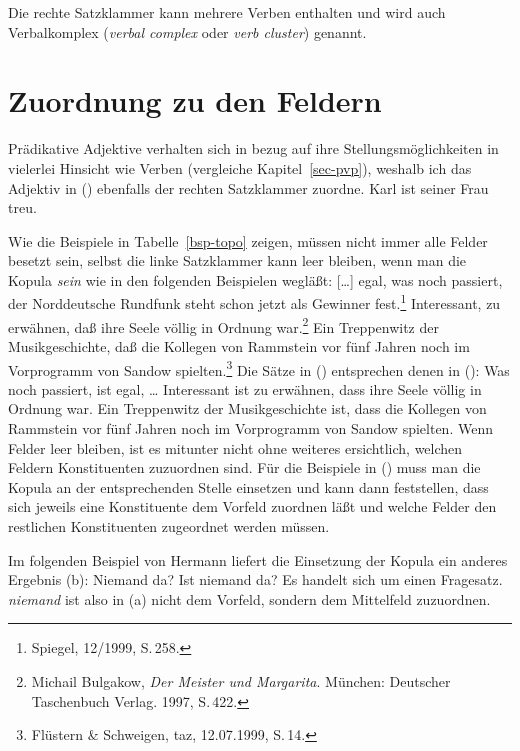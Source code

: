 Die rechte Satzklammer kann mehrere Verben enthalten und wird auch 
Verbalkomplex (\emph{verbal complex} oder \emph{verb cluster}) genannt.

\section{Zuordnung zu den Feldern}

Prädikative Adjektive verhalten sich in bezug auf ihre Stellungsmöglichkeiten in vielerlei Hinsicht
wie Verben (vergleiche Kapitel~\ref{sec-pvp}), weshalb ich das Adjektiv in () ebenfalls der
rechten Satzklammer zuordne.
\ea
Karl ist seiner Frau treu.
\z

\noindent
Wie die Beispiele in Tabelle~\ref{bsp-topo} zeigen, müssen nicht immer
alle Felder besetzt sein, selbst die linke Satzklammer kann leer bleiben,
wenn man die Kopula \emph{sein} wie in den folgenden Beispielen wegläßt:
\eal
\ex
{}[\ldots]
egal,      was  noch  passiert, der Norddeutsche Rundfunk             steht  schon   jetzt als Gewinner fest.\footnote{
        Spiegel, 12/1999, S.\,258.
}
\ex Interessant, zu erwähnen, daß ihre Seele völlig    in Ordnung war.\footnote{
        Michail Bulgakow, \emph{Der Meister und Margarita}. München: Deutscher Taschenbuch Verlag. 1997, S.\,422.
      }
\ex
Ein Treppenwitz der    Musikgeschichte, daß die Kollegen   von Rammstein vor    fünf Jahren noch im      Vorprogramm   von Sandow spielten.\footnote{
         Flüstern \& Schweigen, taz, 12.07.1999, S.\,14. %
}
\zl
Die Sätze in () entsprechen denen in ():
\eal
\ex 
Was noch passiert, ist egal, \ldots
\ex
Interessant ist zu erwähnen, dass ihre Seele völlig in Ordnung war.
\ex 
Ein Treppenwitz der Musikgeschichte ist, dass die Kollegen von Rammstein vor fünf Jahren noch im Vorprogramm von Sandow spielten.
\zl
Wenn Felder leer bleiben, ist es mitunter nicht ohne weiteres
ersichtlich, welchen Feldern Konstituenten zuzuordnen sind.
Für die Beispiele in () muss man die Kopula an der entsprechenden Stelle einsetzen und kann
dann feststellen, dass sich jeweils eine Konstituente dem Vorfeld zuordnen läßt und welche Felder
den restlichen Konstituenten zugeordnet werden müssen.

Im folgenden Beispiel von Hermann \citet[]{Paul1919a} liefert die Einsetzung der Kopula
ein anderes Ergebnis (b):
\eal
\ex Niemand da?
\ex Ist niemand da?
\zl
Es handelt sich um einen Fragesatz. \emph{niemand} ist also in (a)
nicht dem Vorfeld, sondern dem Mittelfeld zuzuordnen.

